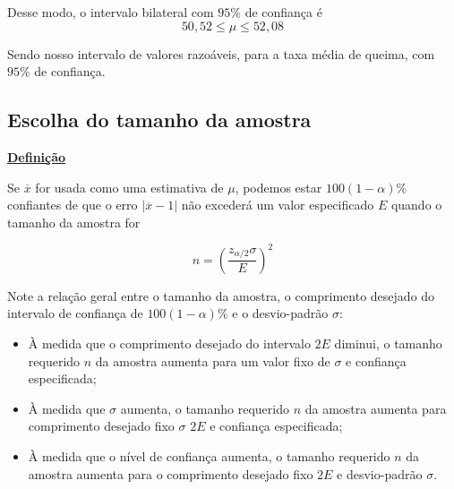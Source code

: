 \documentclass[a4paper,12pt]{article} %
\begin{document}
	\begin{center}
		Desse modo, o intervalo bilateral com $95\%$ de confiança é
		\begin{equation*}
			50,52 \leq  \mu \leq52,08
		\end{equation*}
		
	\end{center}
	
	Sendo nosso intervalo de valores razoáveis, para a taxa média de queima, com $95\%$ de confiança.
	
	
	\subsection*{Escolha do tamanho da amostra}
	\vspace{0,2cm}
	\begin{blockquote}
		\begin{center}
			\vspace{0,2cm}
			\textbf{\underline {Definição}} 
		\end{center}
		
		Se $ \overline{x} $ for usada como uma estimativa de $\mu$, podemos estar $100(1-\alpha)\%$ confiantes de que o erro $|\overline{x}-1|$ não excederá um valor especificado $E$ quando o tamanho da amostra for
		
		\begin{equation*}
			n=\left(\frac{z_{\alpha / 2 }{\sigma}}{E} \right)^2
		\end{equation*}
		
		\vspace{0,2cm}
	\end{blockquote}
	\vspace{0,4cm}
	
	Note a relação geral entre o tamanho da amostra, o comprimento desejado do intervalo de confiança de $ 100 (1 - \alpha ) \% $ e o desvio-padrão $\sigma$:
	
	\begin{itemize}
		\item À medida que o comprimento desejado do intervalo $2E$ diminui, o tamanho requerido $n$ da amostra aumenta para um valor fixo de $\sigma$ e confiança especificada;
		\item  À medida que $\sigma$ aumenta, o tamanho requerido $n$ da amostra aumenta para comprimento desejado fixo $\sigma$ $2E$ e confiança especificada;
		\item À medida que o nível de confiança aumenta, o tamanho requerido $n$ da amostra aumenta para o comprimento desejado fixo $2E$ e desvio-padrão $\sigma$.
		
	\end{itemize}
	
\end{document}
